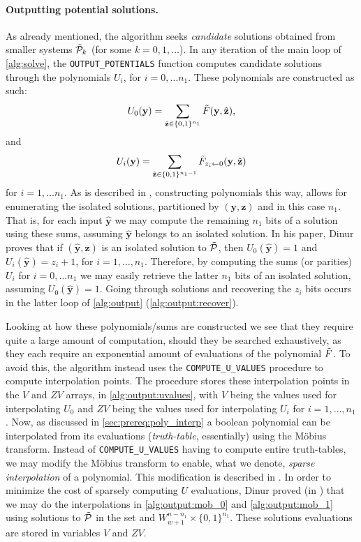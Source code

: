 \paragraph{Outputting potential solutions.} As already mentioned, the algorithm seeks \textit{candidate} solutions obtained from smaller systems $\Tilde{\mathcal{P}}_k$ (for some $k = 0, 1,\dots $). In any iteration of the main loop of \cref{alg:solve}, the \texttt{OUTPUT\_POTENTIALS} function computes candidate solutions through the polynomials $U_i$, for $i = 0, \dots n_1$. These polynomials are constructed as such: 
$$
U_0(\mathbf{y}) = \sum_{\hat{\mathbf{z}} \in \{0,1\}^{n_1}} \Tilde{F}(\mathbf{y}, \hat{\mathbf{z}}),
$$
and
$$
U_i(\mathbf{y}) = \sum_{\hat{\mathbf{z}} \in \{0,1\}^{n_1 - 1}} \Tilde{F}_{z_i \leftarrow 0}(\mathbf{y}, \hat{\mathbf{z}})
$$
for $i = 1, \dots n_1$. As is described in \cite{cryptoeprint:2021/578}, constructing polynomials this way, allows for enumerating the isolated solutions, partitioned by $(\mathbf{y},\mathbf{z})$ and in this case $n_1$. That is, for each input $\hat{\mathbf{y}}$ we may compute the remaining $n_1$ bits of a solution using these sums, assuming $\hat{\mathbf{y}}$ belongs to an isolated solution. In his paper, Dinur proves that if $(\hat{\mathbf{y}}, \hat{\mathbf{z}})$ is an isolated solution to $\Tilde{\mathcal{P}}$, then $U_0(\hat{\mathbf{y}}) = 1$ and $U_i(\hat{\mathbf{y}}) = z_i + 1$, for $i = 1, \dots, n_1$. Therefore, by computing the sums (or parities) $U_i$ for $i = 0, \dots n_1$ we may easily retrieve the latter $n_1$ bits of an isolated solution, assuming $U_0(\hat{\mathbf{y}}) = 1$. Going through solutions and recovering the $z_i$ bits occurs in the latter loop of \cref{alg:output} (\cref{alg:output:recover}).

Looking at how these polynomials/sums are constructed we see that they require quite a large amount of computation, should they be searched exhaustively, as they each require an exponential amount of evaluations of the polynomial $\Tilde{F}$. To avoid this, the algorithm instead uses the \texttt{COMPUTE\_U\_VALUES} procedure to compute interpolation points. The procedure stores these interpolation points in the $V$ and $ZV$ arrays, in \cref{alg:output:uvalues}, with $V$ being the values used for interpolating $U_0$ and $ZV$ being the values used for interpolating $U_i$ for $i = 1, \dots, n_1$. Now, as discussed in \cref{sec:prereq:poly_interp} a boolean polynomial can be interpolated from its evaluations (\textit{truth-table}, essentially) using the Möbius transform. Instead of \texttt{COMPUTE\_U\_VALUES} having to compute entire truth-tables, we may modify the Möbius transform to enable, what we denote, \textit{sparse interpolation} of a polynomial. This modification is described in \cite{10.1007/978-3-642-21702-9_6}. In order to minimize the cost of sparsely computing $U$ evaluations, Dinur proved (in \cite{cryptoeprint:2021/578}) that we may do the interpolations in \cref{alg:output:mob_0} and \cref{alg:output:mob_1} using solutions to $\Tilde{\mathcal{P}}$ in the set and $W^{n - n_1}_{w + 1} \times \{0, 1\}^{n_1}$. These solutions evaluations are stored in variables $V$ and $ZV$.


